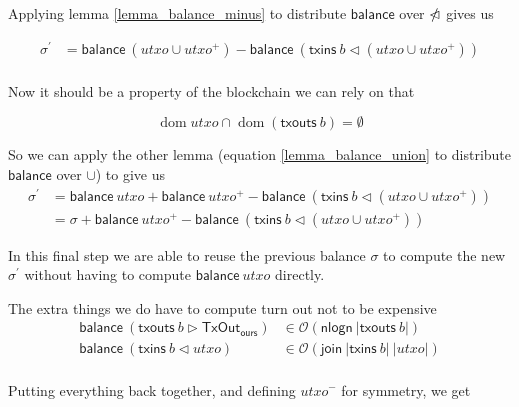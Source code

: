 \documentclass{article}
\newcommand{\order}[1]{\mathcal{O}\left(#1\right)}
\DeclareMathOperator{\dom}{dom}
\newcommand{\restrictdom}{\lhd}
\newcommand{\subtractdom}{\mathbin{\slashed{\restrictdom}}}
\newcommand{\restrictrange}{\rhd}
\begin{document}
Applying lemma \ref{lemma_balance_minus} to distribute $\mathsf{balance}$ over $\subtractdom$ gives us

\begin{equation*}
\begin{split}
    \sigma^\prime & = \mathsf{balance} ~ (utxo \cup utxo^+) - \mathsf{balance} ~ (\mathsf{txins} ~ b \restrictdom (utxo \cup utxo^+)) \\
\end{split}
\end{equation*}

Now it should be a property of the blockchain we can rely on that

\begin{equation*}
\dom utxo \cap \dom (\mathsf{txouts} ~ b) = \emptyset
\end{equation*}

So we can apply the other lemma (equation \ref{lemma_balance_union} to distribute $\mathsf{balance}$ over $\cup$) to give us
\begin{equation*}
\begin{split}
    \sigma^\prime & = \mathsf{balance} ~ utxo + \mathsf{balance} ~ utxo^+ - \mathsf{balance} ~ (\mathsf{txins} ~ b \restrictdom (utxo \cup utxo^+)) \\
             & = \sigma + \mathsf{balance} ~ utxo^+ - \mathsf{balance} ~ (\mathsf{txins} ~ b \restrictdom (utxo \cup utxo^+))
\end{split}
\end{equation*}

In this final step we are able to reuse the previous balance $\sigma$ to
compute the new $\sigma^\prime$ without having to compute
$\mathsf{balance} ~ utxo$ directly.

The extra things we do have to compute turn out not to be expensive
\begin{equation*}
\begin{split}
\mathsf{balance} ~ (\mathsf{txouts} ~ b \restrictrange \mathsf{TxOut_{ours}})  & \in \order{\mathsf{nlogn} ~ |\mathsf{txouts}~ b|} \\
\mathsf{balance} ~ (\mathsf{txins} ~ b \restrictdom utxo) & \in \order{\mathsf{join} ~ |\mathsf{txins}~ b| ~ |utxo|} \\
\end{split}
\end{equation*}

Putting everything back together, and defining $utxo^-$ for symmetry, we get
\end{document}
